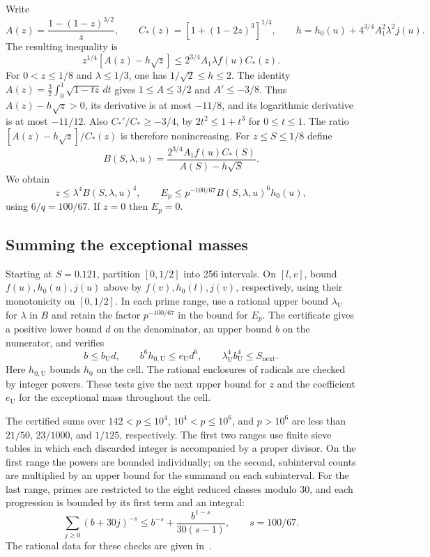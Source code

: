 \documentclass[11pt,a4paper]{article}
\begin{document}
Write
\[
 A(z)=\frac{1-(1-z)^{3/2}}z,\qquad C_*(z)=[1+(1-2z)^3]^{1/4},
 \qquad h=h_0(u)+4^{3/4}A_1^2\lambda^2 j(u).
\]
The resulting inequality is
\[
 z^{1/4}[A(z)-h\sqrt z]\le 2^{3/4}A_1\lambda f(u)C_*(z).
\]
For \(0<z\le1/8\) and \(\lambda\le1/3\), one has
\(1/\sqrt2\le h\le2\).
The identity \(A(z)=\tfrac32\int_0^1\sqrt{1-tz}\,dt\) gives
\(1\le A\le3/2\) and \(A'\le-3/8\).
Thus \(A(z)-h\sqrt z>0\), its derivative is at most \(-11/8\),
and its logarithmic derivative is at most \(-11/12\).
Also \(C_*'/C_*\ge-3/4\), by \(2t^2\le1+t^3\) for \(0\le t\le1\).
The ratio \([A(z)-h\sqrt z]/C_*(z)\) is therefore nonincreasing.
For \(z\le S\le1/8\) define
\[
 B(S,\lambda,u)=
 \frac{2^{3/4}A_1 f(u) C_*(S)}{A(S)-h\sqrt S}.
\]
We obtain
\[
 z\le\lambda^4 B(S,\lambda,u)^4,\qquad
 E_p\le p^{-100/67}B(S,\lambda,u)^6 h_0(u),
\]
using \(6/q=100/67\). If \(z=0\) then \(E_p=0\).

\subsection{Summing the exceptional masses}

Starting at \(S=0.121\), partition \([0,1/2]\) into 256 intervals.
On \([l,v]\), bound \(f(u),h_0(u),j(u)\) above by
\(f(v),h_0(l),j(v)\), respectively, using their monotonicity on
\([0,1/2]\). In each prime range, use a rational upper bound
\(\lambda_{\mathrm U}\) for \(\lambda\) in \(B\) and retain the
factor \(p^{-100/67}\) in the bound for \(E_p\).
The certificate gives a positive lower bound \(d\) on the denominator,
an upper bound \(b\) on the numerator, and verifies
\[
 b\le b_{\mathrm U}d,\qquad
 b^6 h_{0,\mathrm U}\le e_{\mathrm U}d^6,\qquad
 \lambda_{\mathrm U}^4 b_{\mathrm U}^4\le S_{\mathrm{next}}.
\]
Here \(h_{0,\mathrm U}\) bounds \(h_0\) on the cell. The rational
enclosures of radicals are checked by integer powers. These tests
give the next upper bound for \(z\) and the coefficient \(e_{\mathrm U}\)
for the exceptional mass throughout the cell.

The certified sums over \(142<p\le10^4\), \(10^4<p\le10^6\), and
\(p>10^6\) are less than \(21/50\), \(23/1000\), and \(1/125\),
respectively. The first two ranges use finite sieve tables in which
each discarded integer is accompanied by a proper divisor. On the
first range the powers are bounded individually; on the second,
subinterval counts are multiplied by an upper bound for the summand
on each subinterval. For the last range, primes are restricted to the
eight reduced classes modulo \(30\), and each progression is bounded
by its first term and an integral:
\[
 \sum_{j\ge0}(b+30j)^{-s}\le b^{-s}+\frac{b^{1-s}}{30(s-1)},
 \qquad s=100/67.
\]
The rational data for these checks are given in~\cite{LeanCode}.
\end{document}
